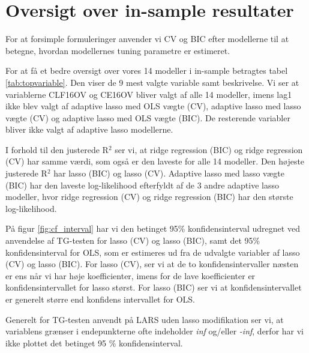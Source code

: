 \section{Oversigt over in-sample resultater} 
For at forsimple formuleringer anvender vi CV og BIC efter modellerne til at betegne, hvordan modellernes tuning parametre er estimeret.

For at få et bedre oversigt over vores 14 modeller i in-sample betragtes tabel \ref{tab:topvariable}.
Den viser de 9 mest valgte variable samt beskrivelse. Vi ser at variablerne \textcolor{blue3}{CLF16OV} og \textcolor{blue3}{CE16OV} bliver valgt af alle 14 modeller, imens \textcolor{blue3}{lag1} ikke blev valgt af adaptive lasso med OLS vægte (CV), adaptive lasso med lasso vægte (CV) og adaptive lasso med OLS vægte (BIC). 
De resterende variabler bliver ikke valgt af adaptive lasso modellerne. 



I forhold til den justerede R$^2$ ser vi, at ridge regression (BIC) og ridge regression (CV) har samme værdi, som også er den laveste for alle 14 modeller. 
Den højeste  justerede R$^2$  har lasso (BIC) og lasso (CV).
Adaptive lasso med lasso vægte (BIC) har den laveste log-likelihood efterfyldt af de 3 andre adaptive lasso modeller, hvor ridge regression (CV) og ridge regression (BIC) har den største log-likelihood. 


På figur \ref{fig:cf_interval} har vi den betinget 95\%  konfidensinterval udregnet ved anvendelse af TG-testen for lasso (CV) og lasso (BIC), samt det 95\% konfidensinterval for OLS, som er estimeres ud fra de udvalgte variabler af lasso (CV) og lasso (BIC). 
For lasso (CV), ser vi at de to konfidensintervaller næsten er ens når vi har høje koefficienter, imens for de lave koefficienter er konfidensintervallet for lasso størst. 
For lasso (BIC) ser vi at konfidensintervallet er generelt større end konfidens intervallet for OLS.


Generelt for TG-testen anvendt på LARS uden lasso modifikation ser vi, at variablens grænser i endepunkterne ofte indeholder \textit{inf} og/eller \textit{-inf}, derfor har vi ikke plottet det betinget 95 \% konfidensinterval. 









